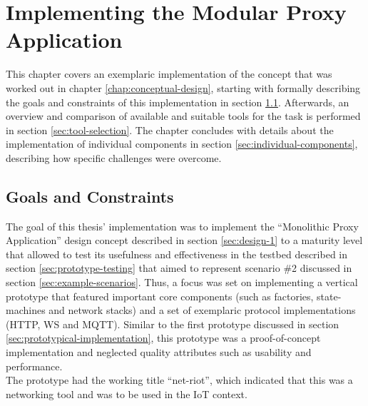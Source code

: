 \chapter{Implementing the Modular Proxy Application}
\label{chap:implementation}
This chapter covers an exemplaric implementation of the concept that was worked out in chapter \ref{chap:conceptual-design}, starting with formally describing the goals and constraints of this implementation in section \ref{sec:goals-constraints}. Afterwards, an overview and comparison of available and suitable tools for the task is performed in section \ref{sec:tool-selection}. The chapter concludes with details about the implementation of individual components in section \ref{sec:individual-components}, describing how specific challenges were overcome.%

\section{Goals and Constraints}
\label{sec:goals-constraints}
The goal of this thesis' implementation was to implement the \enquote{Monolithic Proxy Application} design concept described in section \ref{sec:design-1} to a maturity level that allowed to test its usefulness and effectiveness in the testbed described in section \ref{sec:prototype-testing} that aimed to represent scenario \#2 discussed in section \ref{sec:example-scenarios}. Thus, a focus was set on implementing a vertical prototype that featured important core components (such as factories, state-machines and network stacks) and a set of exemplaric protocol implementations (\ac{HTTP}, \ac{WS} and \ac{MQTT}). Similar to the first prototype discussed in section \ref{sec:prototypical-implementation}, this prototype was a proof-of-concept implementation and neglected quality attributes such as usability and performance.\\
The prototype had the working title \enquote{net-riot}, which indicated that this was a networking tool and was to be used in the \ac{IoT} context. %

